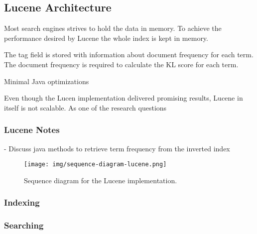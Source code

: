 \subsection{Lucene Architecture}
\cite{lucene-documentation}
Most search engines strives to hold the data in memory.
To achieve the performance desired by Lucene the whole index is kept in memory.

The tag field is stored with information about document frequency for each term.
The document frequency is required to calculate the KL score for each term.

Minimal Java optimizations

Even though the Lucen implementation delivered promising results, Lucene in itself is not scalable.
As one of the research questions

\subsubsection{Lucene Notes}
- Discuss java methods to retrieve term frequency from the inverted index

\begin{figure}[h!]
  \centering \texttt{[image: img/sequence-diagram-lucene.png]}
  \caption{Sequence diagram for the Lucene implementation.}
  \label{fig:sequence-diagram-lucene}
\end{figure}

\subsubsection{Indexing}
\subsubsection{Searching}
